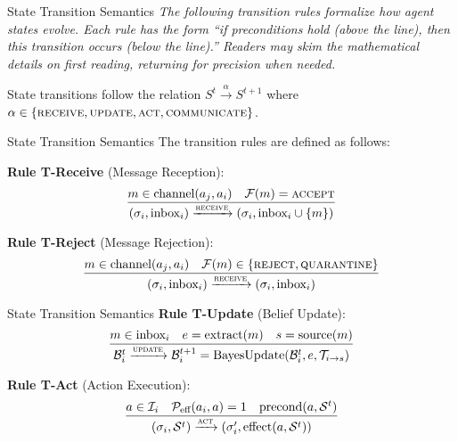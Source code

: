 \documentclass[
  ignorenonframetext,
]{beamer}
\begin{document}
\begin{frame}[allowframebreaks]{State Transition Semantics}
\protect{}\label{state-transition-semantics}
\emph{The following transition rules formalize how agent states evolve.
Each rule has the form ``if preconditions hold (above the line), then
this transition occurs (below the line).'' Readers may skim the
mathematical details on first reading, returning for precision when
needed.}

\begin{definition}
\label{def:transition}
State transitions follow the relation $S^t \xrightarrow{\alpha} S^{t+1}$ where $\alpha \in \{\textsc{receive}, \textsc{update}, \textsc{act}, \textsc{communicate}\}$.
\end{definition}

\end{frame}

\begin{frame}[allowframebreaks]{State Transition Semantics}
The transition rules are defined as follows:

\textbf{Rule T-Receive} (Message Reception): \begin{equation}
\label{eq:rule-receive}
\frac{m \in \text{channel}(a_j, a_i) \quad \mathcal{F}(m) = \textsc{accept}}{(\sigma_i, \text{inbox}_i) \xrightarrow{\textsc{receive}} (\sigma_i, \text{inbox}_i \cup \{m\})}
\end{equation}

\textbf{Rule T-Reject} (Message Rejection): \begin{equation}
\label{eq:rule-reject}
\frac{m \in \text{channel}(a_j, a_i) \quad \mathcal{F}(m) \in \{\textsc{reject}, \textsc{quarantine}\}}{(\sigma_i, \text{inbox}_i) \xrightarrow{\textsc{receive}} (\sigma_i, \text{inbox}_i)}
\end{equation}

\end{frame}

\begin{frame}[allowframebreaks]{State Transition Semantics}
\textbf{Rule T-Update} (Belief Update): \begin{equation}
\label{eq:rule-update}
\frac{m \in \text{inbox}_i \quad e = \text{extract}(m) \quad s = \text{source}(m)}{\mathcal{B}_i^t \xrightarrow{\textsc{update}} \mathcal{B}_i^{t+1} = \text{BayesUpdate}(\mathcal{B}_i^t, e, \mathcal{T}_{i \to s})}
\end{equation}

\textbf{Rule T-Act} (Action Execution): \begin{equation}
\label{eq:rule-act}
\frac{a \in \mathcal{I}_i \quad \mathcal{P}_{\text{eff}}(a_i, a) = 1 \quad \text{precond}(a, \mathcal{S}^t)}{(\sigma_i, \mathcal{S}^t) \xrightarrow{\textsc{act}} (\sigma_i', \text{effect}(a, \mathcal{S}^t))}
\end{equation}

\end{frame}
\end{document}
